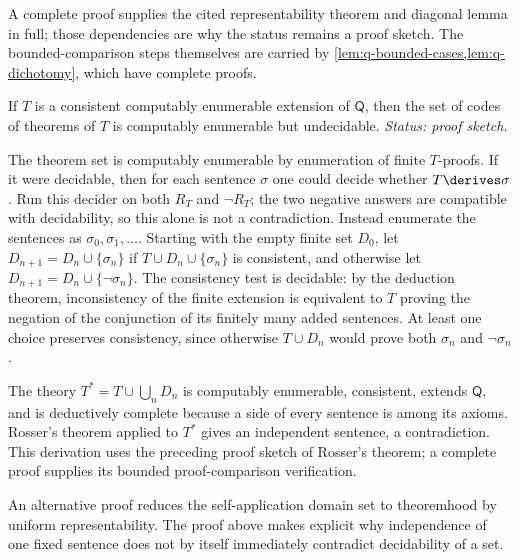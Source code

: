 \begin{proofplan}
A complete proof supplies the cited representability theorem and diagonal
lemma in full; those dependencies are why the status remains a proof
sketch.  The bounded-comparison steps themselves are carried by
\cref{lem:q-bounded-cases,lem:q-dichotomy}, which have complete proofs.
\end{proofplan}

\begin{corollary}
If \(T\) is a consistent computably enumerable extension of \(\mathsf Q\),
then the set of codes of theorems of \(T\) is computably enumerable but
undecidable.
\textit{Status: proof sketch.}
\end{corollary}

\begin{proofplan}
The theorem set is computably enumerable by enumeration of finite \(T\)-proofs.  If it were
decidable, then for each sentence \(\sigma\) one could decide whether
\(T\derives\sigma\).  Run this decider on both \(R_T\) and \(\neg R_T\); the
two negative answers are compatible with decidability, so this alone is not a
contradiction.  Instead enumerate the sentences as
\(\sigma_0,\sigma_1,\ldots\).  Starting with the empty finite set \(D_0\), let
\(D_{n+1}=D_n\cup\{\sigma_n\}\) if \(T\cup D_n\cup\{\sigma_n\}\) is
consistent, and otherwise let
\(D_{n+1}=D_n\cup\{\neg\sigma_n\}\).  The consistency test is decidable:
by the deduction theorem, inconsistency of the finite extension is equivalent
to \(T\) proving the negation of the conjunction of its finitely many added
sentences.  At least one choice preserves consistency, since otherwise
\(T\cup D_n\) would prove both \(\sigma_n\) and \(\neg\sigma_n\).

The theory \(T^*=T\cup\bigcup_nD_n\) is computably enumerable, consistent, extends
\(\mathsf Q\), and is deductively complete because a side of every sentence
is among its axioms.  Rosser's theorem applied to \(T^*\) gives an independent
sentence, a contradiction.
This derivation uses the preceding proof sketch of Rosser's theorem; a complete
proof supplies its bounded proof-comparison verification.
\end{proofplan}

\begin{remark}
An alternative proof reduces the self-application domain set to theoremhood by uniform
representability.  The proof above makes explicit why independence of one
fixed sentence does not by itself immediately contradict decidability of a
set.
\end{remark}


